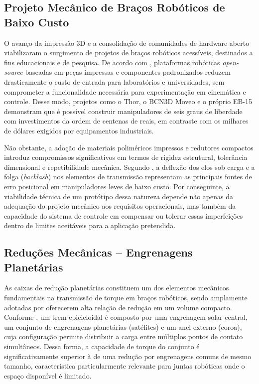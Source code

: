 \subsection{Projeto Mecânico de Braços Robóticos de Baixo Custo}


O avanço da impressão 3D e a consolidação de comunidades de hardware aberto viabilizaram o surgimento de projetos de braços robóticos acessíveis, destinados a fins educacionais e de pesquisa. De acordo com , plataformas robóticas \textit{open-source} baseadas em peças impressas e componentes padronizados reduzem drasticamente o custo de entrada para laboratórios e universidades, sem comprometer a funcionalidade necessária para experimentação em cinemática e controle. Desse modo, projetos como o Thor, o BCN3D Moveo e o próprio EB-15 demonstram que é possível construir manipuladores de seis graus de liberdade com investimentos da ordem de centenas de reais, em contraste com os milhares de dólares exigidos por equipamentos industriais.

Não obstante, a adoção de materiais poliméricos impressos e redutores compactos introduz compromissos significativos em termos de rigidez estrutural, tolerância dimensional e repetibilidade mecânica. Segundo , a deflexão dos elos sob carga e a folga (\textit{backlash}) nos elementos de transmissão representam as principais fontes de erro posicional em manipuladores leves de baixo custo. Por conseguinte, a viabilidade técnica de um protótipo dessa natureza depende não apenas da adequação do projeto mecânico aos requisitos operacionais, mas também da capacidade do sistema de controle em compensar ou tolerar essas imperfeições dentro de limites aceitáveis para a aplicação pretendida.

\subsection{Reduções Mecânicas -- Engrenagens Planetárias}

As caixas de redução planetárias constituem um dos elementos mecânicos fundamentais na transmissão de torque em braços robóticos, sendo amplamente adotadas por oferecerem alta relação de redução em um volume compacto. Conforme , um trem epicicloidal é composto por uma engrenagem solar central, um conjunto de engrenagens planetárias (satélites) e um anel externo (coroa), cuja configuração permite distribuir a carga entre múltiplos pontos de contato simultâneos. Dessa forma, a capacidade de torque do conjunto é significativamente superior à de uma redução por engrenagens comuns de mesmo tamanho, característica particularmente relevante para juntas robóticas onde o espaço disponível é limitado.


